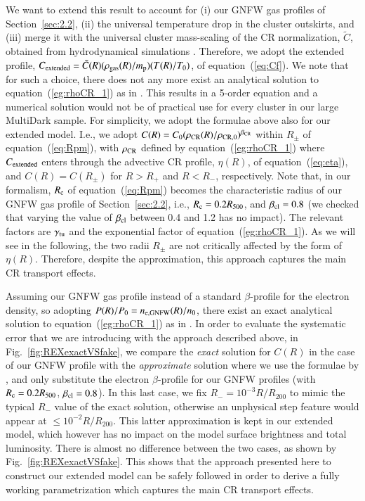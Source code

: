 \documentclass[useAMS,usenatbib]{mn2e}
\begin{document}
\begin{appendix}
We want to extend this result to account for (i) our GNFW gas profiles of
Section~\ref{sec:2.2}, (ii) the universal temperature drop in the cluster
outskirts, and (iii) merge it with the universal cluster mass-scaling of the CR
normalization, $\tilde{C}$, obtained from hydrodynamical simulations
\citep{2010MNRAS.409..449P}.  Therefore, we adopt the extended profile,
$C_{\rm{extended}} = \tilde{C}(R) (\rho_{{\mathrm{gas}}}(R)/m_{\mathrm{p}}) (T(R)/T_0)$, of
equation~(\ref{eq:Cf}). We note that for such a choice, there does not any more
exist an analytical solution to equation~(\ref{eg:rhoCR_1}) as in
\cite{2011A&A...527A..99E}. This results in a 5-order equation and a numerical
solution would not be of practical use for every cluster in our large MultiDark
sample. For simplicity, we adopt the formulae above also for our extended
model. I.e., we adopt
$C(R)=C_{0}(\rho_{{\mathrm{CR}}}(R)/\rho_{{\mathrm{CR}},0})^{\beta_{{\mathrm{CR}}}}$ within
$R_{\pm}$ of equation~(\ref{eq:Rpm}), with $\rho_{{\mathrm{CR}}}$ defined by
equation~(\ref{eg:rhoCR_1}) where $C_{{\mathrm{extended}}}$ enters through the
advective CR profile, $\eta(R)$, of equation~(\ref{eq:eta}), and $C(R) =
C(R_{\pm})$ for $R > R_{+}$ and $R < R_{-}$, respectively.  Note that, in our
formalism, $R_{{\mathrm{c}}}$ of equation~(\ref{eq:Rpm}) becomes the characteristic
radius of our GNFW gas profile of Section~\ref{sec:2.2}, i.e., $R_{{\mathrm{c}}} =
0.2 R_{500}$, and $\beta_{{\mathrm{cl}}}=0.8$ (we checked that varying the value of
$\beta_{{\mathrm{cl}}}$ between 0.4 and 1.2 has no impact).  The relevant factors are
$\gamma_{{\mathrm{tu}}}$ and the exponential factor of
equation~(\ref{eg:rhoCR_1}). As we will see in the following, the two radii
$R_{\pm}$ are not critically affected by the form of $\eta(R)$. Therefore,
despite the approximation, this approach captures the main CR transport effects.

Assuming our GNFW gas profile instead of a standard $\beta$-profile for the
electron density, so adopting $P(R)/P_{0}=n_{{\mathrm{e,GNFW}}}(R)/n_{0}$, there
exist an exact analytical solution to equation~(\ref{eg:rhoCR_1}) as in
\cite{2011A&A...527A..99E}. In order to evaluate the systematic error that we
are introducing with the approach described above, in
Fig.~\ref{fig:REXexactVSfake}, we compare the \emph{exact} solution for $C(R)$
in the case of our GNFW profile with the \emph{approximate} solution where we
use the formulae by \cite{2011A&A...527A..99E}, and only substitute the electron
$\beta$-profile for our GNFW profiles (with $R_{{\mathrm{c}}} = 0.2 R_{500}$,
$\beta_{{\mathrm{cl}}}=0.8$). In this last case, we fix $R_{-}=10^{-3}R/R_{200}$ to
mimic the typical $R_{-}$ value of the exact solution, otherwise an unphysical
step feature would appear at $\leq10^{-2}R/R_{200}$. This latter approximation
is kept in our extended model, which however has no impact on the model surface
brightness and total luminosity. There is almost no difference between the two
cases, as shown by Fig.~\ref{fig:REXexactVSfake}. This shows that the approach
presented here to construct our extended model can be safely followed in order to
derive a fully working parametrization which captures the main CR transport
effects.


\end{appendix}
\end{document}
